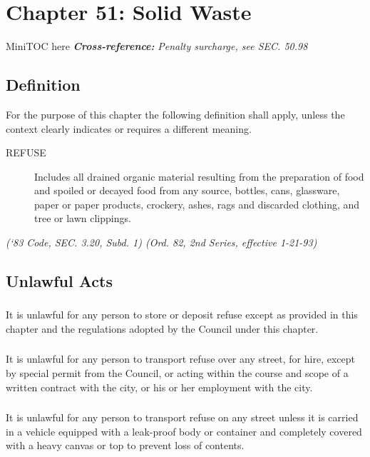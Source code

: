 %
\chapter*{Chapter 51: \newline
	Solid Waste}

MiniTOC here\newline
\textbf{\emph{{Cross-reference:}}}\newline
\emph{Penalty surcharge, see SEC. 50.98}
\pagebreak

\section{Definition}
For the purpose of this chapter the following definition shall apply, unless the context clearly indicates or requires a different meaning.
\begin{description}
\item[REFUSE] Includes all drained organic material resulting from the preparation of food and spoiled or decayed food from any source, bottles, cans, glassware, paper or paper products, crockery, ashes, rags and discarded clothing, and tree or lawn clippings.
\end{description}
\emph{(‘83 Code, SEC. 3.20, Subd. 1) (Ord. 82, 2nd Series, effective 1-21-93)}
\section{Unlawful Acts}
\subsection{}
It is unlawful for any person to store or deposit refuse except as provided in this chapter and the regulations adopted by the Council under this chapter.
\subsection{}
It is unlawful for any person to transport refuse over any street, for hire, except by special permit from the Council, or acting within the course and scope of a written contract with the city, or his or her employment with the city.
\subsection{}
It is unlawful for any person to transport refuse on any street unless it is carried in a vehicle equipped with a leak-proof body or container and completely covered with a heavy canvas or top to prevent loss of contents.
